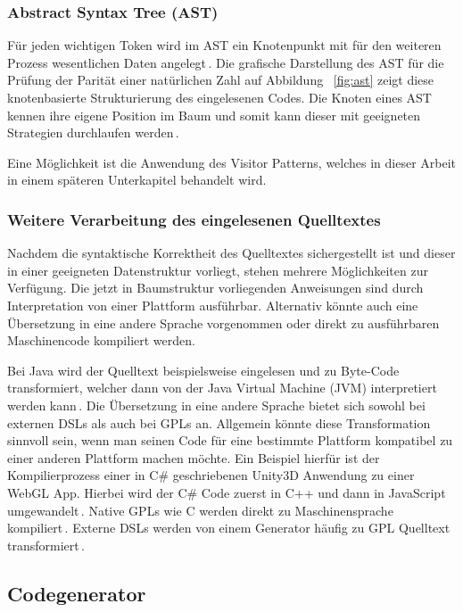 \documentclass[12pt,oneside,a4paper,parskip]{scrbook}
\begin{document}
\subsubsection{Abstract Syntax Tree (AST)}

Für jeden wichtigen Token wird im AST ein Knotenpunkt mit für den weiteren Prozess wesentlichen Daten angelegt\,\cite[S.\,23]{parr2009}. Die grafische Darstellung des AST für die Prüfung der Parität einer natürlichen Zahl auf Abbildung ~\ref{fig:ast} zeigt diese knotenbasierte Strukturierung des eingelesenen Codes. Die Knoten eines AST kennen ihre eigene Position im Baum und somit kann dieser mit geeigneten Strategien durchlaufen werden\,\cite[S.\,24]{parr2009}.

Eine Möglichkeit ist die Anwendung des Visitor Patterns, welches in dieser Arbeit in einem späteren Unterkapitel behandelt wird.

\subsubsection{Weitere Verarbeitung des eingelesenen Quelltextes}

Nachdem die syntaktische Korrektheit des Quelltextes sichergestellt ist und dieser in einer geeigneten Datenstruktur vorliegt, stehen mehrere Möglichkeiten zur Verfügung. Die jetzt in Baumstruktur vorliegenden Anweisungen sind durch Interpretation von einer Plattform ausführbar. Alternativ könnte auch eine Übersetzung in eine andere Sprache vorgenommen oder direkt zu ausführbaren Maschinencode kompiliert werden.

Bei Java wird der Quelltext beispielsweise eingelesen und zu Byte-Code transformiert, welcher dann von der Java Virtual Machine (JVM) interpretiert werden kann\,\cite{javavm2014}. Die Übersetzung in eine andere Sprache bietet sich sowohl bei externen DSLs als auch bei GPLs an. Allgemein könnte diese Transformation sinnvoll sein, wenn man seinen Code für eine bestimmte Plattform kompatibel zu einer anderen Plattform machen möchte. Ein Beispiel hierfür ist der Kompilierprozess einer in C\# geschriebenen Unity3D Anwendung zu einer WebGL App. Hierbei wird der C\# Code zuerst in C++ und dann in JavaScript umgewandelt\,\cite{unity2018}. Native GPLs wie C werden direkt zu Maschinensprache kompiliert\,\cite{kernighan1988}. Externe DSLs werden von einem Generator häufig zu GPL Quelltext transformiert\,\cite[S.\,26]{voelter2013}.

\subsection{Codegenerator}
\end{document}
